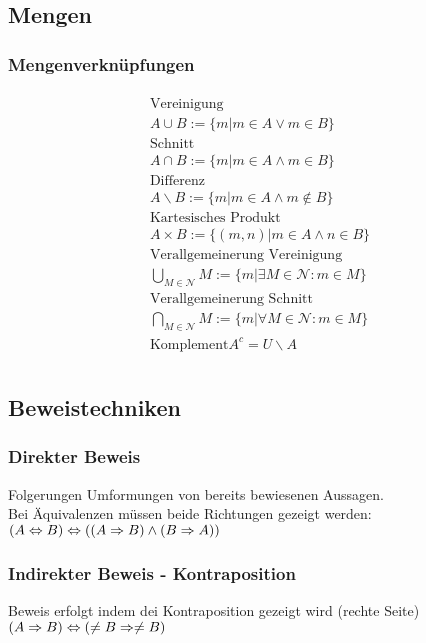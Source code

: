 \subsection*{Mengen}

\subsubsection*{Mengenverknüpfungen}
\begin{align*}
    \begin{array}{l}
        \text{Vereinigung}\\
        A\cup B := \{m | m \in A \lor m \in B\}\\
        \text{Schnitt}\\
        A \cap B := \{m | m \in A \land m \in B\}\\
        \text{Differenz}\\
        A \backslash B := \{m | m \in A \land m \notin B\}\\
        \text{Kartesisches Produkt}\\
        A \times B := \{(m, n) | m \in A \land n \in B\}\\
        \text{Verallgemeinerung Vereinigung}\\
        \bigcup_{M \in \mathcal{N}} M := \{m | \exists M \in \mathcal{N}: m \in M\}\\
        \text{Verallgemeinerung Schnitt}\\
        \bigcap_{M \in \mathcal{N}} M := \{m | \forall M \in \mathcal{N}: m \in M\}\\
        \text{Komplement}
        A^c = U \backslash A\\
    \end{array}
\end{align*}
\subsection*{Beweistechniken}
\subsubsection*{Direkter Beweis}
Folgerungen Umformungen von bereits bewiesenen Aussagen.\\
Bei Äquivalenzen müssen beide Richtungen gezeigt werden:\\
$(A \Leftrightarrow B) \Leftrightarrow ((A \Rightarrow B) \land (B \Rightarrow A))$
\subsubsection*{Indirekter Beweis - Kontraposition}
Beweis erfolgt indem dei Kontraposition gezeigt wird (rechte Seite)\\
$(A \Rightarrow B) \Leftrightarrow (\neq B \Rightarrow \neq B)$\\
